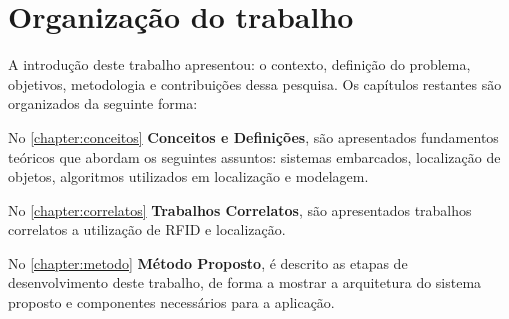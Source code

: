 \begin{comment}
\section{Metodologia Proposta}

\section{Contribuições propostas}
As contribuições propostas deste trabalho são:
\begin{enumerate}
    \item A implementação de um sistema para localização de objetos. O Metódo utilizado visa localizar objeto sem alta precisão, porém é viável para controle de acervos.
    \item O sistema desevolvido pode auxiliar no controle e ainda facilitar o levantamento de todos os bens do proprietário.
\end{enumerate}

\end{comment}
\section{Organização do trabalho}
A introdução deste trabalho apresentou: o contexto, definição do problema, objetivos, metodologia e contribuições dessa pesquisa. Os capítulos restantes são organizados da seguinte forma:

\par
No \autoref{chapter:conceitos} \textbf{Conceitos e Definições}, são apresentados fundamentos teóricos que abordam os seguintes assuntos: sistemas embarcados, localização de objetos, algoritmos utilizados em localização e modelagem.

\par
No \autoref{chapter:correlatos} \textbf{Trabalhos Correlatos}, são apresentados trabalhos correlatos a utilização de RFID e localização.

\par
No \autoref{chapter:metodo} \textbf{Método Proposto}, é descrito as etapas de desenvolvimento deste trabalho, de forma a mostrar a arquitetura do sistema proposto e componentes necessários para a aplicação.


